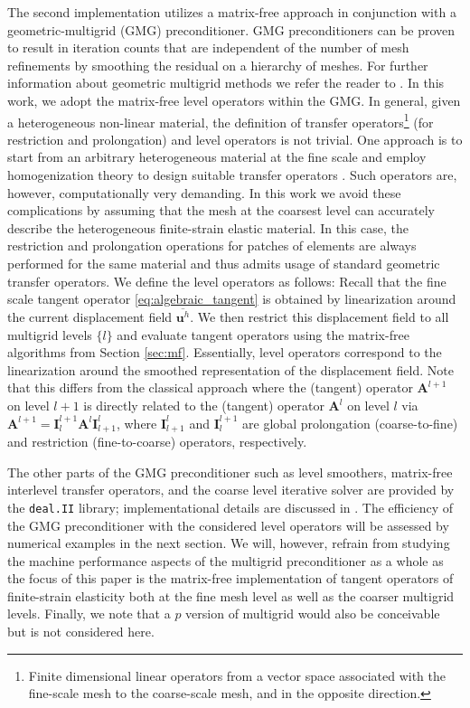 \documentclass[AMA,STIX1COL]{WileyNJD-v2}
\newcommand*{\gz}[1]{\boldsymbol{#1}}
\begin{document}
The second implementation utilizes a matrix-free approach in conjunction with a geometric-multigrid (GMG) preconditioner.
GMG preconditioners \cite{Bramble1990, Briggs2000, Janssen2011,May2015} can be proven to result in iteration counts that are independent of the
number of mesh refinements by smoothing the residual on a hierarchy of meshes.
For further information about geometric multigrid methods we refer the reader to \cite{Briggs2000,Hackbusch1985,Wesseling1992}.
%
%
In this work, we adopt the matrix-free level operators within the GMG.
In general, given a heterogeneous non-linear material, the definition of transfer operators\footnote{Finite dimensional linear operators from a vector space associated
with the fine-scale mesh to the coarse-scale mesh, and in the opposite direction.} (for restriction and prolongation) and level operators is not trivial.
One approach is to start from an arbitrary heterogeneous material at the fine scale and employ homogenization theory \cite{Suquet1987, Hill1972,Hashin1983,Castaneda1997} to design suitable transfer operators \cite{Miehe2007, Kaczmarczyk2010}.
Such operators are, however, computationally very demanding.
In this work we avoid these complications by assuming
that the mesh at the coarsest level can accurately describe the heterogeneous finite-strain elastic material.
In this case, the restriction and prolongation operations for patches of elements are always performed for the same material and
thus admits usage of standard geometric transfer operators.
We define the level operators as follows: Recall that the fine scale tangent operator \eqref{eq:algebraic_tangent} is obtained by
linearization around the current displacement field $\overline{\gz u^h}$. We then restrict this displacement field to all multigrid levels $\{l\}$ and
evaluate tangent operators using the matrix-free algorithms from Section \ref{sec:mf}.
Essentially, level operators correspond to the linearization around the smoothed representation of the displacement field.
Note that this differs from the classical approach where the (tangent) operator $\gz A^{l+1}$ on level $l+1$ is directly related to the (tangent) operator
$\gz A^{l}$ on level $l$ via $\gz A^{l+1}=\gz I^{l+1}_{l} \gz A^l \gz I^l_{l+1}$, where $\gz I^l_{l+1}$ and $\gz I^{l+1}_l$ are global
prolongation (coarse-to-fine) and restriction (fine-to-coarse) operators, respectively.

The other parts of the GMG preconditioner such as level smoothers, matrix-free interlevel transfer operators, and the
coarse level iterative solver are provided by the \texttt{deal.II} library; implementational details are discussed in \cite{Clevenger2018}.
%
The efficiency of the GMG preconditioner with the considered level operators will be assessed by numerical examples in the next section.
We will, however, refrain from studying the machine performance aspects of the multigrid preconditioner as a whole as the focus of this paper is
the matrix-free implementation of tangent operators of finite-strain elasticity both at the fine mesh level as well as the coarser multigrid levels.
%
Finally, we note that a $p$ version of multigrid \cite{Ronquist1987} would also be conceivable but is not considered here.
\end{document}
